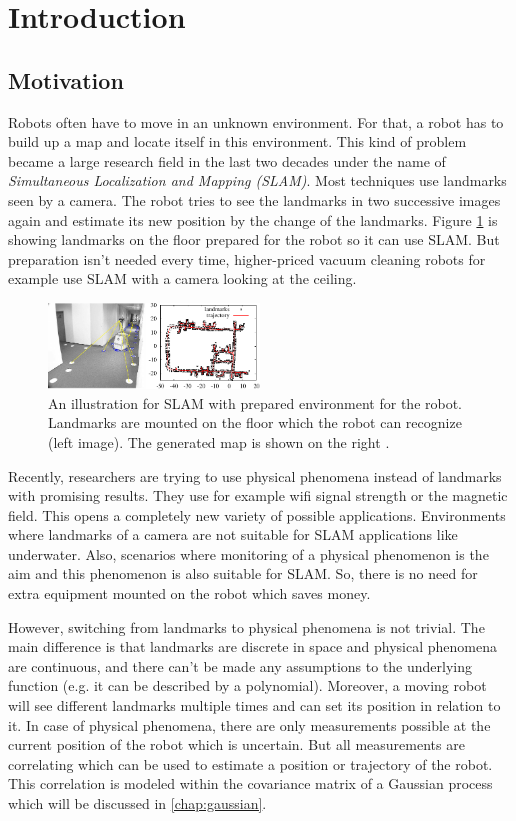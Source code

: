 \section{Introduction}
\subsection{Motivation}
Robots often have to move in an unknown environment. For that, a robot has to build up a map
and locate itself in this environment. This kind of problem became a large research
field in the last two decades under the name of \textit{Simultaneous Localization and Mapping
(SLAM)}. Most techniques use landmarks seen by a camera. The robot tries
to see the landmarks in two successive images again and estimate its new position by the change
of the landmarks. Figure \ref{fig:grisetti_slam_example} is showing landmarks on the floor prepared 
for the robot so it can use SLAM. But preparation isn't needed every time, higher-priced vacuum cleaning 
robots for example use SLAM with a camera looking at the ceiling.

\begin{figure}[h!]
	\centering
	\includegraphics[width=0.5\textwidth]{images/grisetti_slam_example.png}
	\caption{
		An illustration for SLAM with prepared environment for the robot.
		Landmarks are mounted on the floor which the robot can recognize (left image).
		The generated map is shown on the right \cite{grisetti_tutorial_2010}.
		}
	\label{fig:grisetti_slam_example}
\end{figure}

Recently, researchers are trying to use physical phenomena instead of landmarks with promising results. 
They use for example wifi signal strength or the magnetic field. This opens a completely new variety of possible applications. 
Environments where landmarks of a camera are not suitable for SLAM applications like underwater. Also, scenarios 
where monitoring of a physical phenomenon is the aim and this phenomenon is also suitable for SLAM. So, there
is no need for extra equipment mounted on the robot which saves money.

However, switching from landmarks to physical phenomena is not trivial. The main difference is that landmarks
are discrete in space and physical phenomena are continuous, and there can't be made any assumptions to the
underlying function (e.g. it can be described by a polynomial). Moreover, a moving robot will see different
landmarks multiple times and can set its position in relation to it. In case of physical phenomena,
there are only measurements possible at the current position of the robot which is uncertain. But all 
measurements are correlating which can be used to estimate a position or trajectory of the robot. This 
correlation is modeled within the covariance matrix of a Gaussian process which will be discussed in 
\ref{chap:gaussian}.
